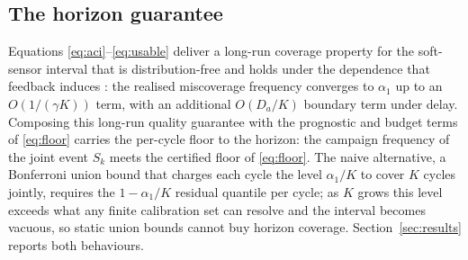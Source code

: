 \subsection{The horizon guarantee}
\label{sec:horizon}

Equations \eqref{eq:aci}--\eqref{eq:usable} deliver a long-run coverage property for the
soft-sensor interval that is distribution-free and holds under the dependence that feedback
induces \citep{gibbs2021}: the realised miscoverage frequency converges to $\alpha_1$ up to an
$O(1/(\gamma K))$ term, with an additional $O(D_a/K)$ boundary term under delay. Composing this
long-run quality guarantee with the prognostic and budget terms of \eqref{eq:floor} carries the
per-cycle floor to the horizon: the campaign frequency of the joint event $S_k$ meets the
certified floor of \eqref{eq:floor}. The naive alternative, a Bonferroni union bound that
charges each cycle the level $\alpha_1/K$ to cover $K$ cycles jointly, requires the
$1-\alpha_1/K$ residual quantile per cycle; as $K$ grows this level exceeds what any finite
calibration set can resolve and the interval becomes vacuous, so static union bounds cannot buy
horizon coverage. Section~\ref{sec:results} reports both behaviours.
